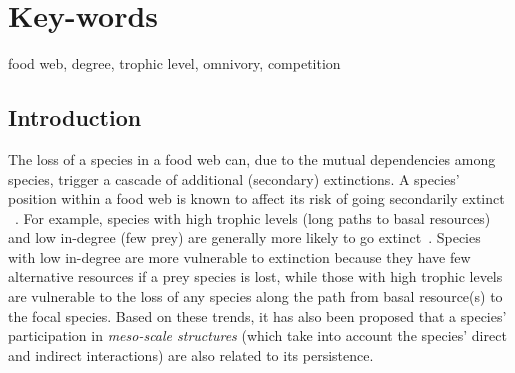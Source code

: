 \documentclass[12pt]{article}
\begin{document}
\section*{Key-words}
    food web, degree, trophic level, omnivory, competition

\clearpage
\begin{spacing}{2.0}
\linenumbers

\section*{Introduction} %

    The loss of a species in a food web can, due to the mutual dependencies among species,  trigger a cascade of additional (secondary) extinctions. 
    A species' position within a food web is known to affect its risk of going secondarily extinct ~\citep{Santos2021,curtsdotter2011robustness, dunne2009cascading, Eklof2006}.
    For example, species with high trophic levels (long paths to basal resources) and low in-degree (few prey) are generally more likely to go extinct~\citep{binzer2011susceptibility, Eklof2006}.
    Species with low in-degree are more vulnerable to extinction because they have few alternative resources if a prey species is lost, while those with high trophic levels are vulnerable to the loss of any species along the path from basal resource(s) to the focal species.
    Based on these trends, it has also been proposed that a species' participation in \emph{meso-scale structures} (which take into account the species' direct and indirect interactions) are also related to its persistence.
    

\end{spacing}
\end{document}
